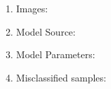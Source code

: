 \documentclass{article}
\begin{document}
\begin{enumerate}
	\item	Images:
	\item	Model Source:
	\item	Model Parameters:
	\item	Misclassified samples: 
\end{enumerate}
\end{document}
